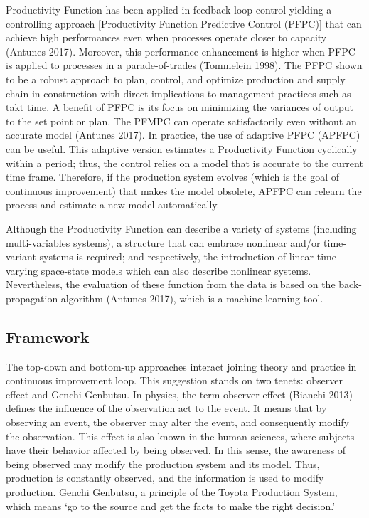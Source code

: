 \documentclass{article}
\begin{document}
Productivity Function has been applied in feedback loop control yielding a controlling approach [Productivity Function Predictive Control (PFPC)] that can achieve high performances even when processes operate closer to capacity (Antunes 2017).
Moreover, this performance enhancement is higher when PFPC is applied to processes in a parade-of-trades (Tommelein 1998).
The PFPC shown to be a robust approach to plan, control, and optimize production and supply chain in construction with direct implications to management practices such as takt time.
A benefit of PFPC is its focus on minimizing the variances of output to the set point or plan.
The PFMPC can operate satisfactorily even without an accurate model (Antunes 2017).
In practice, the use of adaptive PFPC (APFPC) can be useful.
This adaptive version estimates a Productivity Function cyclically within a period; thus, the control relies on a model that is accurate to the current time frame.
Therefore, if the production system evolves (which is the goal of continuous improvement) that makes the model obsolete, APFPC can relearn the process and estimate a new model automatically.

Although the Productivity Function can describe a variety of systems (including
multi-variables systems), a structure that can embrace nonlinear and/or time-variant systems is required; and respectively, the introduction of linear time-varying space-state models which can also describe nonlinear systems.
Nevertheless, the evaluation of these function from the data is based on the back-propagation algorithm (Antunes 2017), which is a machine learning tool.

\subsection{Framework}
\label{sec:orgc3e409a}

The top-down and bottom-up approaches interact joining theory and practice in continuous improvement loop.
This suggestion stands on two tenets: observer effect and Genchi Genbutsu.
In physics, the term observer effect (Bianchi 2013) defines the influence of the observation act to the event.
It means that by observing an event, the observer may alter the event, and consequently modify the observation.
This effect is also known in the human sciences, where subjects have their behavior affected by being observed.
In this sense, the awareness of being observed may modify the production system and its model.
Thus, production is constantly observed, and the information is used to modify production.
Genchi Genbutsu, a principle of the Toyota Production System, which means ‘go to the source and get the facts to make the right decision.’
\end{document}
